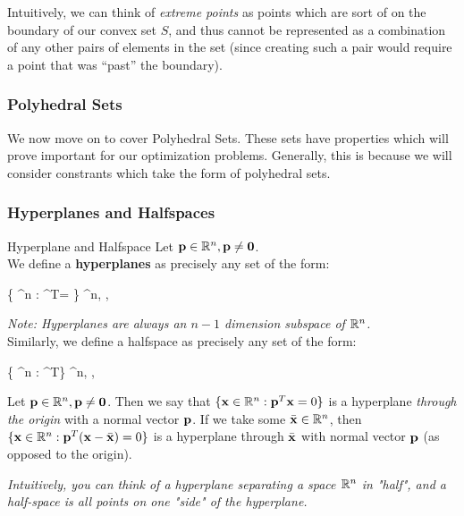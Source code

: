 Intuitively, we can think of \textit{extreme points} as points which are sort of
on the boundary of our convex set $S$, and thus cannot be represented as a combination
of any other pairs of elements in the set (since creating such a pair would
require a point that was ``past'' the boundary).

\pagebreak
\subsubsection{Polyhedral Sets}

We now move on to cover Polyhedral Sets. These sets have properties which will
prove important for our optimization problems. Generally, this is because we will
consider constrants which take the form of polyhedral sets.

\subsubsection{Hyperplanes and Halfspaces}

\begin{defn}{Hyperplane and Halfspace}{}
Let $\mathbf{p} \in \mathbb{R}^n, \mathbf{p} \neq \mathbf{0}$. 
\medskip\\
We define a \textbf{hyperplanes} as precisely any set of the form:
\begin{frml}
	\{ \vx \in \reals^n : \vp^T\vx = \alpha \} \st \vp \in \reals^n, 
	\vp \neq \vzero, \alpha \in \reals
\end{frml}
\textit{Note: Hyperplanes are always an $n - 1$ dimension subspace of $\mathbb{R}^n$.}
\bigskip\\
Similarly, we define a halfspace as precisely any set of the form:
\begin{frml}
	\{ \vx \in \reals^n : \vp^T\vx \geq \alpha \} \st \vp \in \reals^n, 
	\vp \neq \vzero, \alpha \in \reals
\end{frml}
\end{defn}

Let $\mathbf{p} \in \mathbb{R}^n, \mathbf{p} \neq \mathbf{0}$.  Then we say that 
$\{ \mathbf{x} \in \mathbb{R}^n: \mathbf{p}^T\mathbf{x} = 0\}$ is a hyperplane \textit{through the 
origin} with a normal vector $\mathbf{p}$. 
If we take some $\bar{\mathbf{x}} \in \mathbb{R}^n$, then 
$\{\mathbf{x} \in \mathbb{R}^n : \mathbf{p}^T(\mathbf{x} - \bar{\mathbf{x}}) = 0\}$ is a hyperplane through
$\bar{\mathbf{x}}$ with normal vector $\mathbf{p}$ (as opposed to the origin).

\textit{Intuitively, you can think of a hyperplane separating a space $\mathbb{R}^n$ in "half", 
and a half-space is all points on one "side" of the hyperplane.}

